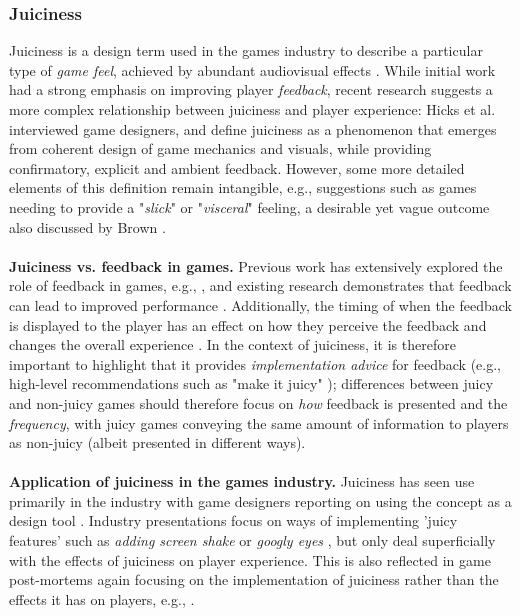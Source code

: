 \documentclass{sigchi}
\begin{document}
\subsubsection{Juiciness}
Juiciness is a design term used in the games industry to describe a particular type of \textit{game feel}, achieved by abundant audiovisual effects \cite{gabler_how_nodate,jonasson2018juice,juul2010casual}. While initial work had a strong emphasis on improving player \textit{feedback}, recent research suggests a more complex relationship between juiciness and player experience: Hicks et al. \cite{hicks2018juicy} interviewed game designers, and define juiciness as a phenomenon that emerges from coherent design of game mechanics and visuals, while providing confirmatory, explicit and ambient feedback. However, some more detailed elements of this definition remain intangible, e.g., suggestions such as games needing to provide a "\textit{slick}" or "\textit{visceral}" feeling, a desirable yet vague outcome also discussed by Brown \cite{brown2013gut}.
\\\\
\textbf{Juiciness vs. feedback in games.} Previous work has extensively explored the role of feedback in games, e.g., \cite{desurvire2009game,deterding2015lens,hunicke2004mda}, and existing research demonstrates that feedback can lead to improved performance \cite{lamoth2012exergaming}. Additionally, the timing of when the feedback is displayed to the player has an effect on how they perceive the feedback and changes the overall experience \cite{chapman1999engagement}. In the context of juiciness, it is therefore important to highlight that it provides \textit{implementation advice} for feedback (e.g., high-level recommendations such as "make it juicy" \cite{jonasson2018juice}); differences between juicy and non-juicy games should therefore focus on \textit{how} feedback is presented and the \textit{frequency}, with juicy games conveying the same amount of information to players as non-juicy (albeit presented in different ways).
\\\\
\textbf{Application of juiciness in the games industry.} Juiciness has seen use primarily in the industry with game designers reporting on using the concept as a design tool \cite{hagen2011designing,whitkin2014juicy}. Industry presentations focus on ways of implementing 'juicy features' such as \textit{adding screen shake} \cite{nijman2013screenshake} or \textit{googly eyes} \cite{jonasson2018juice}, but only deal superficially with the effects of juiciness on player experience. This is also reflected in game post-mortems again focusing on the implementation of juiciness rather than the effects it has on players, e.g., \cite{loeschen2017juicy}. 
\end{document}
